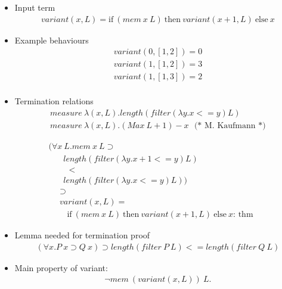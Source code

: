\begin{slide}

\begin{itemize}
\item Input term \\
\begin{eqnarray*}
variant(x,L) = \mbox{if}\ (mem\ x\ L)\ \mbox{then}\ variant(x+1,L)\
\mbox{else}\ x 
\end{eqnarray*}

\item Example behaviours
\[
\begin{array}{c}
 variant(0, [1,2]) = 0 \\
 variant(1, [1,2]) = 3 \\
 variant(1, [1,3]) = 2 \\
\end{array}
\]
\item Termination relations
\[
\begin{array}{l}
measure\  \lambda (x,L). length(filter(\lambda y. x <= y) L) \\
measure\  \lambda (x,L). (Max\ L + 1 ) - x{~~~}   \mbox{(* M. Kaufmann *)}
\end{array}
\]
\end{itemize}
\end{slide}

\begin{slide}
\medskip
\[
\begin{array}{l}
 (\forall x\ L. mem\ x\ L \supset \\
{~~~~~~~~}length(filter(\lambda y. x+1 <= y) L)  \\
{~~~~~~~~~~~}          < \\
{~~~~~~~~}        length(filter(\lambda y. x <= y) L)) \\
{~~~~~~}\supset \\
{~~~~~~}variant (x,L) = \\
{~~~~~~~~~~} \mbox{if}\ (mem\ x\ L)\ \mbox{then}\ variant(x+1,L)\
\mbox{else}\ x \mbox{: thm} 
\end{array}
\]
\end{slide}

\begin{slide}
\begin{itemize}
\item Lemma needed for termination proof
\begin{eqnarray*}
 (\forall x. P\ x \supset Q\ x) \supset length(filter\ P\ L) <=
 length(filter\ Q\ L) 
\end{eqnarray*}
\item Main property of variant:
\begin{eqnarray*}
 \neg mem\ (variant (x,L))\ L.
\end{eqnarray*}
\end{itemize}
\end{slide}


